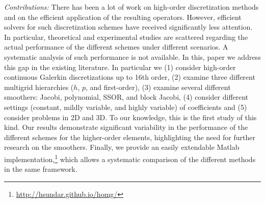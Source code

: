 \documentclass[times]{nlaauth}
\begin{document}
{\em Contributions:} 
There has been a lot of work on high-order discretization methods and on the efficient application of the resulting operators. However, efficient solvers for such
discretization schemes have received significantly less attention. In particular, theoretical and experimental studies are scattered regarding the actual performance of
the different schemes under different scenarios. A systematic analysis of such performance is not available.
In this, paper we address this gap in the existing literature. In particular we (1) consider high-order continuous Galerkin discretizations up to 16th order, (2) examine three different multigrid hierarchies ($h$, $p$, and first-order), (3) examine several different smoothers: Jacobi, polynomial, SSOR, and block Jacobi, (4) consider different settings (constant, mildly variable, and highly variable) of coefficients and (5) consider problems in 2D and 3D.
To our knowledge, this is the first study of this kind. Our results demonstrate significant variability in the performance of the different schemes for the higher-order
elements, highlighting the need for further research on the smoothers. Finally, we provide an easily extendable Matlab
implementation,\footnote{\url{http://hsundar.github.io/homg/}} which allows a systematic comparison of the different methods in the same framework.

\end{document}
